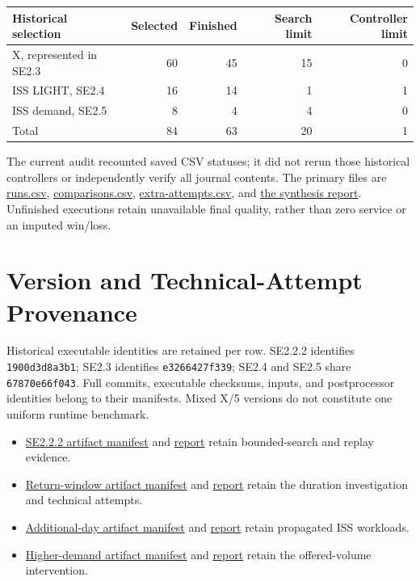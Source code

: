 \documentclass[11pt]{article}
\begin{document}
\begin{center}
\begin{tabular}{lrrrr}
\toprule Historical selection & Selected & Finished & Search limit & Controller limit \\
\midrule
X, represented in SE2.3 & 60 & 45 & 15 & 0 \\
ISS LIGHT, SE2.4 & 16 & 14 & 1 & 1 \\
ISS demand, SE2.5 & 8 & 4 & 4 & 0 \\
\midrule Total & 84 & 63 & 20 & 1 \\
\bottomrule
\end{tabular}
\end{center}

The current audit recounted saved CSV statuses; it did not rerun those historical controllers or independently verify all journal contents. The primary files are \href{../research-synthesis/runs.csv}{runs.csv}, \href{../research-synthesis/comparisons.csv}{comparisons.csv}, \href{../research-synthesis/extra-attempts.csv}{extra-attempts.csv}, and \href{../research-synthesis/report.md}{the synthesis report}. Unfinished executions retain unavailable final quality, rather than zero service or an imputed win/loss.

\section{Version and Technical-Attempt Provenance}
Historical executable identities are retained per row. SE2.2.2 identifies \texttt{1900d3d8a3b1}; SE2.3 identifies \texttt{e3266427f339}; SE2.4 and SE2.5 share \texttt{67870e66f043}. Full commits, executable checksums, inputs, and postprocessor identities belong to their manifests. Mixed X/5 versions do not constitute one uniform runtime benchmark.

\begin{itemize}
\item \href{../security-evaluation-se222/artifact-manifest.json}{SE2.2.2 artifact manifest} and \href{../security-evaluation-se222/report.md}{report} retain bounded-search and replay evidence.
\item \href{../security-evaluation-c3/artifact-manifest.json}{Return-window artifact manifest} and \href{../security-evaluation-c3/report.md}{report} retain the duration investigation and technical attempts.
\item \href{../security-evaluation-new-days/artifact-manifest.json}{Additional-day artifact manifest} and \href{../security-evaluation-new-days/report.md}{report} retain propagated ISS workloads.
\item \href{../security-evaluation-remaining-demand/artifact-manifest.json}{Higher-demand artifact manifest} and \href{../security-evaluation-remaining-demand/report.md}{report} retain the offered-volume intervention.
\end{itemize}
\end{document}
